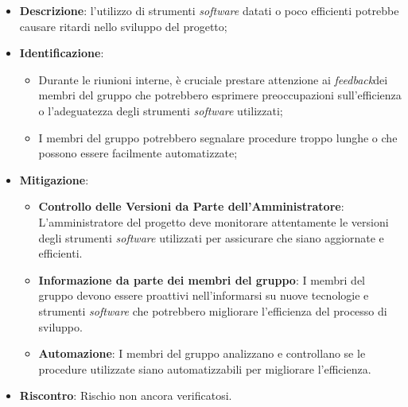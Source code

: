 \label{risk:strumenti software inadeguati}
\begin{itemize}
	\item \textbf{Descrizione}: l'utilizzo di strumenti \textit{software} datati o poco
	      efficienti potrebbe causare ritardi nello sviluppo del progetto;

	\item \textbf{Identificazione}:
	      \begin{itemize}
		      \item Durante le riunioni interne, è cruciale prestare attenzione
		            ai \textit{feedback}\g dei membri del gruppo che potrebbero esprimere
		            preoccupazioni sull'efficienza o l'adeguatezza degli strumenti \textit{software} utilizzati;

		      \item I membri del gruppo potrebbero segnalare procedure troppo lunghe o
		            che possono essere facilmente automatizzate;
	      \end{itemize}

	\item \textbf{Mitigazione}:
	      \begin{itemize}
		      \item \textbf{Controllo delle Versioni da Parte dell'Amministratore}:
		            L'amministratore del progetto deve monitorare attentamente le versioni
		            degli strumenti \textit{software} utilizzati per assicurare che siano aggiornate e efficienti.

		      \item \textbf{Informazione da parte dei membri del gruppo}:
		            I membri del gruppo devono essere proattivi nell'informarsi su nuove tecnologie e
		            strumenti \textit{software} che potrebbero migliorare l'efficienza del processo di sviluppo.

		      \item \textbf{Automazione}:
		            I membri del gruppo analizzano e controllano se le procedure utilizzate siano
		            automatizzabili per migliorare l'efficienza.
	      \end{itemize}
	\item \textbf{Riscontro}: Rischio non ancora verificatosi.
\end{itemize}
